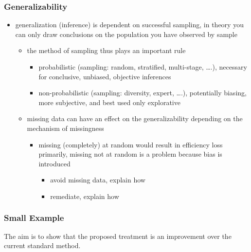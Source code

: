 \documentclass[]{article}
\providecommand{\tightlist}{%
  \setlength{\itemsep}{0pt}\setlength{\parskip}{0pt}}
\begin{document}
\subsubsection{Generalizability}\label{generalizability}

\begin{itemize}
\tightlist
\item
  generalization (inference) is dependent on successful sampling, in
  theory you can only draw conclusions on the population you have
  observed by sample

  \begin{itemize}
  \tightlist
  \item
    the method of sampling thus plays an important rule

    \begin{itemize}
    \tightlist
    \item
      probabilistic (sampling: random, stratified, multi-stage,
      \ldots{}.), necessary for conclusive, unbiased, objective
      inferences
    \item
      non-probabilistic (sampling: diversity, expert, \ldots{}.),
      potentially biasing, more subjective, and best used only
      explorative
    \end{itemize}
  \item
    missing data can have an effect on the generalizability depending on
    the mechanism of missingness

    \begin{itemize}
    \tightlist
    \item
      missing (completely) at random would result in efficiency loss
      primarily, missing not at random is a problem because bias is
      introduced

      \begin{itemize}
      \tightlist
      \item
        avoid missing data, explain how
      \item
        remediate, explain how
      \end{itemize}
    \end{itemize}
  \end{itemize}
\end{itemize}

\subsubsection{Small Example}\label{small-example}

The aim is to show that the proposed treatment is an improvement over
the current standard method.
\end{document}
